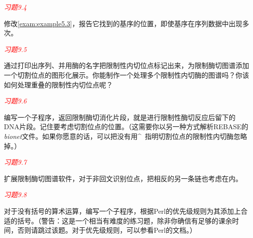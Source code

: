 \textcolor{red}{\textit{习题9.4}}
\begin{adjustwidth}{2em}{}
修改\autoref{exam:example5.3}，报告它找到的基序的位置，即使基序在序列数据中出现多次。
\end{adjustwidth}

\textcolor{red}{\textit{习题9.5}}
\begin{adjustwidth}{2em}{}
通过打印出序列、并用酶的名字把限制性内切位点标记出来，为限制酶切图谱添加一个切割位点的图形化展示。你能制作一个处理多个限制性内切酶的图谱吗？你该如何处理重叠的限制性内切位点呢？
\end{adjustwidth}

\textcolor{red}{\textit{习题9.6}}
\begin{adjustwidth}{2em}{}
编写一个子程序，返回限制酶切消化片段，就是进行限制性酶切反应后留下的DNA片段。记住要考虑切割位点的位置。（这需要你以另一种方式解析REBASE的\textit{bionet}文件。如果你愿意的话，可以把没有用\^~指明切割位点的限制性内切酶忽略掉。）
\end{adjustwidth}


\textcolor{red}{\textit{习题9.7}}
\begin{adjustwidth}{2em}{}
扩展限制酶切图谱软件，对于非回文识别位点，把相反的另一条链也考虑在内。
\end{adjustwidth}

\textcolor{red}{\textit{习题9.8}}
\begin{adjustwidth}{2em}{}
对于没有括号的算术运算，编写一个子程序，根据Perl的优先级规则为其添加上合适的括号。（警告：这是一个相当有难度的练习题，除非你确信有足够的课余时间，否则请跳过该题。对于优先级规则，可以参看Perl的文档。）
\end{adjustwidth}

